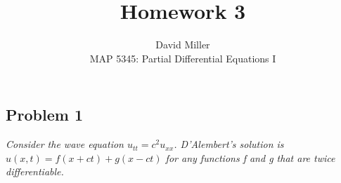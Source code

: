 \documentclass[12pt]{article}
\theoremstyle{remark}
\begin{document}
 
 
\title{Homework 3}
\author{David Miller \\ 
MAP 5345: Partial Differential Equations I} 
 
\maketitle

\subsection*{Problem 1}

\textit{Consider the wave equation $u_{tt} = c^2u_{xx}$. D'Alembert's solution is $u(x,t) = f(x+ct) + g(x-ct)$ for any functions f and g that are twice differentiable.} \\
\end{document}

